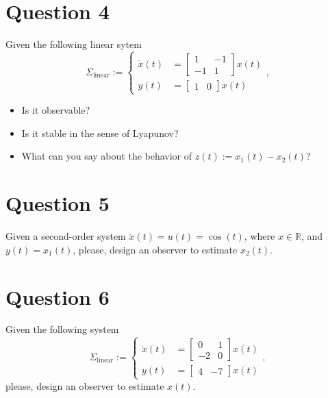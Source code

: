 \documentclass[11pt,a4paper,titlepage]{article}
\begin{document}
\section{Question 4}
Given the following linear sytem
\begin{equation}
	\Sigma_{\text{linear}} := \begin{cases}
		\dot x(t) &= \begin{bmatrix}1 & -1 \\ -1 & 1\end{bmatrix}x(t) \\
			y(t) &= \begin{bmatrix}1 & 0\end{bmatrix}x(t)
	\end{cases},
\label{eq: sigmalin}
\end{equation}

\begin{itemize}
\item Is it observable?
\item Is it stable in the sense of Lyapunov?
\item What can you say about the behavior of $z(t) := x_1(t) - x_2(t)$?
\end{itemize}

\section{Question 5}
Given a second-order system $\ddot x(t) = u(t) = \cos(t)$, where $x\in\mathbb{R}$, and $y(t) = x_1(t)$, please, design an observer to estimate $x_2(t)$.

\section{Question 6}
Given the following system
\begin{equation}
	\Sigma_{\text{linear}} := \begin{cases}
		\dot x(t) &= \begin{bmatrix}0 & 1 \\ -2 & 0\end{bmatrix}x(t) \\
			y(t) &= \begin{bmatrix}4 & -7\end{bmatrix}x(t)
	\end{cases},
\label{eq: sigmalin}
\end{equation}
please, design an observer to estimate $x(t)$.
\end{document}
